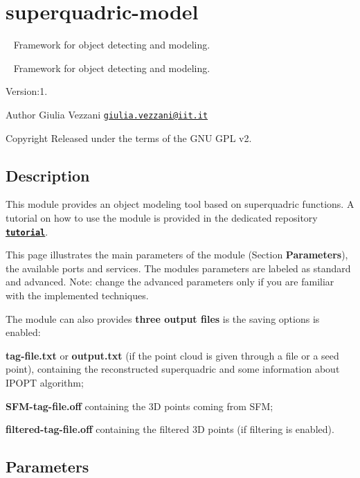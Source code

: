 \section{superquadric-\/model}
\label{group__superquadric-model}


~\newline
 Framework for object detecting and modeling.  


~\newline
 Framework for object detecting and modeling. 

Version\+:1. \begin{DoxyAuthor}{Author}
Giulia Vezzani \href{mailto:giulia.vezzani@iit.it}{\tt giulia.\+vezzani@iit.\+it} ~\newline
 
\end{DoxyAuthor}
\begin{DoxyCopyright}{Copyright}
Released under the terms of the G\+NU G\+PL v2. 
\end{DoxyCopyright}
\hypertarget{group__superquadric-model_intro_sec}{}\subsection{Description}\label{group__superquadric-model_intro_sec}
This module provides an object modeling tool based on superquadric functions. A tutorial on how to use the module is provided in the dedicated repository \href{https://github.com/robotology/superquadric-model/tree/master/tutorial}{\tt {\bfseries tutorial}}.

This page illustrates the main parameters of the module (Section {\bfseries Parameters}), the available ports and services. The modules parameters are labeled as standard and advanced. Note\+: change the advanced parameters only if you are familiar with the implemented techniques.

The module can also provides {\bfseries three output files} is the saving options is enabled\+:
\begin{DoxyItemize}
\item {\bfseries tag-\/file.\+txt} or {\bfseries output.\+txt} (if the point cloud is given through a file or a seed point), containing the reconstructed superquadric and some information about I\+P\+O\+PT algorithm;
\item {\bfseries S\+F\+M-\/tag-\/file.\+off} containing the 3D points coming from S\+FM;
\item {\bfseries filtered-\/tag-\/file.\+off} containing the filtered 3D points (if filtering is enabled).
\end{DoxyItemize}\hypertarget{group__superquadric-model_parameters_sec}{}\subsection{Parameters}\label{group__superquadric-model_parameters_sec}
~\newline

